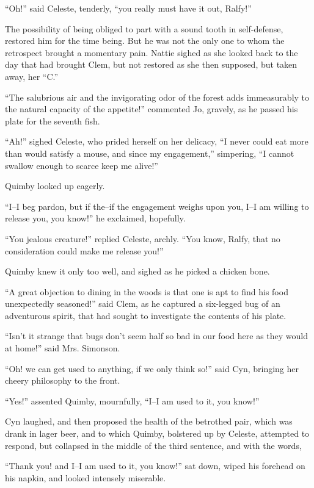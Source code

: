 ``Oh!'' said Celeste, tenderly, ``you really must have it out, Ralfy!''

The possibility of being obliged to part with a sound tooth in
self-defense, restored him for the time being. But he was not the only
one to whom the retrospect brought a momentary pain. Nattie sighed as
she looked back to the day that had brought Clem, but not restored as
she then supposed, but taken away, her ``C.''

``The salubrious air and the invigorating odor of the forest adds
immeasurably to the natural capacity of the appetite!'' commented Jo,
gravely, as he passed his plate for the seventh fish.

``Ah!'' sighed Celeste, who prided herself on her delicacy, ``I never
could eat more than would satisfy a mouse, and since my engagement,''
simpering, ``I cannot swallow enough to scarce keep me alive!''

Quimby looked up eagerly.

``I--I beg pardon, but if the--if the engagement weighs upon you, I--I am
willing to release you, you know!'' he exclaimed, hopefully.

``You jealous creature!'' replied Celeste, archly. ``You know, Ralfy, that
no consideration could make me release you!''

Quimby knew it only too well, and sighed as he picked a chicken bone.

``A great objection to dining in the woods is that one is apt to find his
food unexpectedly seasoned!'' said Clem, as he captured a six-legged bug
of an adventurous spirit, that had sought to investigate the contents of
his plate.

``Isn't it strange that bugs don't seem half so bad in our food here as
they would at home!'' said Mrs. Simonson.

``Oh! we can get used to anything, if we only think so!'' said Cyn,
bringing her cheery philosophy to the front.

``Yes!'' assented Quimby, mournfully, ``I--I am used to it, you know!''

Cyn laughed, and then proposed the health of the betrothed pair, which
was drank in lager beer, and to which Quimby, bolstered up by Celeste,
attempted to respond, but collapsed in the middle of the third sentence,
and with the words,

``Thank you! and I--I am used to it, you know!'' sat down, wiped his
forehead on his napkin, and looked intensely miserable.

